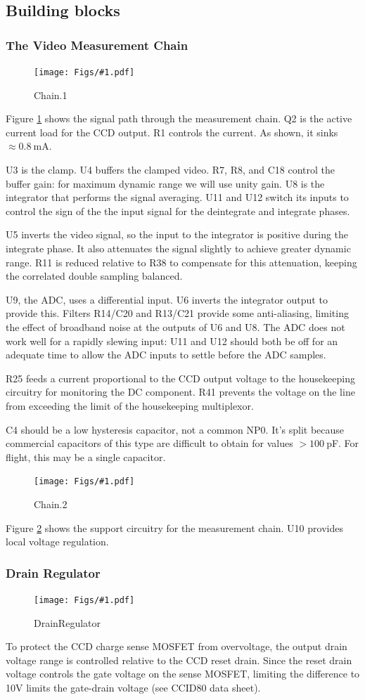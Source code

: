 \documentclass[12pt]{article}
\let\oldsubsection\subsection
\renewcommand{\subsection}{\FloatBarrier\oldsubsection}
\let\oldsubsubsection\subsubsection
\renewcommand{\subsubsection}{\FloatBarrier\oldsubsubsection}
\newcommand{\schempage}[1]{
   \begin{center}
\begin{figure}[ht!]
   \centerline{\texttt{[image: Figs/\#1.pdf]}}
    \caption{#1}
    \label{#1}
    \end{figure}
\end{center}
}
\begin{document}
\subsection{Building blocks}
\subsubsection{The Video Measurement Chain}
\schempage{Chain.1}
Figure \ref{Chain.1} shows the signal path through the measurement chain.
Q2 is the active current load for the CCD output. R1 controls the current. As shown, it sinks $\approx0.8\ $mA.

U3 is the clamp. U4 buffers the clamped video. R7, R8, and C18 control the buffer gain: for maximum dynamic range we will use unity gain. U8 is the integrator that performs the signal averaging. U11 and U12 switch its inputs to control the sign of the the input signal for the deintegrate and integrate phases. 

U5 inverts the video signal, so the input to the integrator is positive during the integrate phase. It also attenuates the signal slightly to achieve greater dynamic range. R11 is reduced relative to R38 to compensate for this attenuation, keeping the correlated double sampling balanced.

U9, the ADC, uses a differential input. U6 inverts the integrator output to provide this. Filters R14/C20 and R13/C21 provide some anti-aliasing, limiting the effect of broadband noise at the outputs of U6 and U8. The ADC does not work well for a rapidly slewing input: U11 and U12 should both be off for an adequate time to allow the ADC inputs to settle before the ADC samples.


R25 feeds a current proportional to the CCD output voltage to the housekeeping circuitry for monitoring the DC component. R41 prevents the voltage on the line from exceeding the limit of the housekeeping multiplexor.

C4 should be a low hysteresis capacitor, not a common NP0. It's split because commercial capacitors of this type are difficult to obtain for values $>100\ $pF. For flight, this may be a single capacitor.

\schempage{Chain.2}
Figure \ref{Chain.2} shows the support circuitry for the measurement chain. U10 provides local voltage regulation.
\subsubsection{Drain Regulator}
\schempage{DrainRegulator}
To protect the CCD charge sense MOSFET from overvoltage, the output drain voltage range is controlled relative to the CCD reset drain.  Since the reset drain voltage controls the gate voltage on the sense MOSFET, limiting the difference to 10V limits the gate-drain voltage (see CCID80 data sheet).
\end{document}
